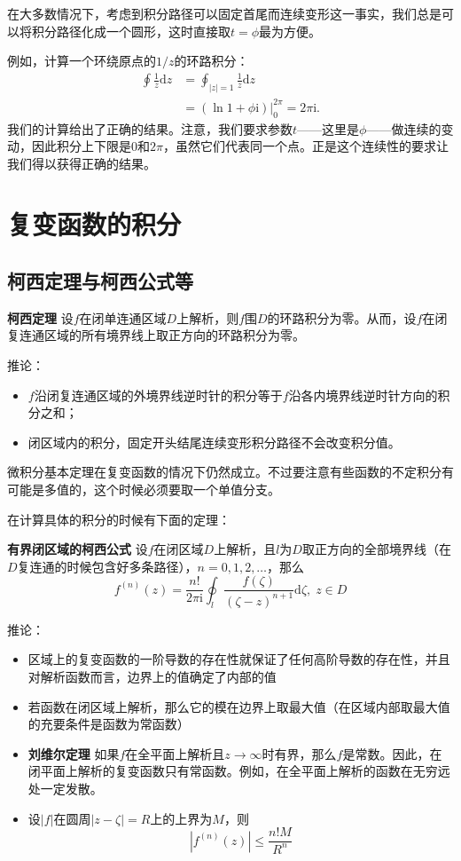\documentclass[UTF8]{ctexart}
\begin{document}
在大多数情况下，考虑到积分路径可以固定首尾而连续变形这一事实，我们总是可以将积分路径化成一个圆形，这时直接取$t=\phi$最为方便。

例如，计算一个环绕原点的$1/z$的环路积分： 
\[
\begin{aligned}
    \oint \frac{1}{z} \mathrm{d}z &= \oint_{|z|=1} \frac{1}{z} \mathrm{d}z \\
    &= (\ln 1 + \phi \mathrm{i}) \big |_0^{2\pi} = 2 \pi \mathrm{i}.
\end{aligned}
\]
我们的计算给出了正确的结果。注意，我们要求参数$t$——这里是$\phi$——做连续的变动，因此积分上下限是0和$2\pi$，虽然它们代表同一个点。正是这个连续性的要求让我们得以获得正确的结果。

\section{复变函数的积分}

\subsection{柯西定理与柯西公式等}

\textbf{柯西定理}
设$f$在闭单连通区域$D$上解析，则$f$围$D$的环路积分为零。从而，设$f$在闭复连通区域的所有境界线上取正方向的环路积分为零。

推论：
\begin{itemize}
    \item $f$沿闭复连通区域的外境界线逆时针的积分等于$f$沿各内境界线逆时针方向的积分之和；
    \item 闭区域内的积分，固定开头结尾连续变形积分路径不会改变积分值。
\end{itemize}

微积分基本定理在复变函数的情况下仍然成立。不过要注意有些函数的不定积分有可能是多值的，这个时候必须要取一个单值分支。

在计算具体的积分的时候有下面的定理：

\textbf{有界闭区域的柯西公式}
设$f$在闭区域$D$上解析，且$l$为$D$取正方向的全部境界线（在$D$复连通的时候包含好多条路径），$n=0, 1, 2, \ldots$，那么
\[
f^{(n)}(z) = \frac{n!}{2\pi \mathrm{i}} \oint_l \frac{f(\zeta)}{(\zeta - z)^{n+1}} \mathrm{d}\zeta, \; z \in D
\]

推论：
\begin{itemize}
    \item 区域上的复变函数的一阶导数的存在性就保证了任何高阶导数的存在性，并且对解析函数而言，边界上的值确定了内部的值
    \item 若函数在闭区域上解析，那么它的模在边界上取最大值（在区域内部取最大值的充要条件是函数为常函数）
    \item \textbf{刘维尔定理}
    如果$f$在全平面上解析且$z \rightarrow \infty$时有界，那么$f$是常数。因此，在闭平面上解析的复变函数只有常函数。例如，在全平面上解析的函数在无穷远处一定发散。
    \item 设$|f|$在圆周$|z-\zeta|=R$上的上界为$M$，则
    \[
      |f^{(n)}(z)| \leq \frac{n! M}{R^n}
    \]
\end{itemize}
\end{document}
